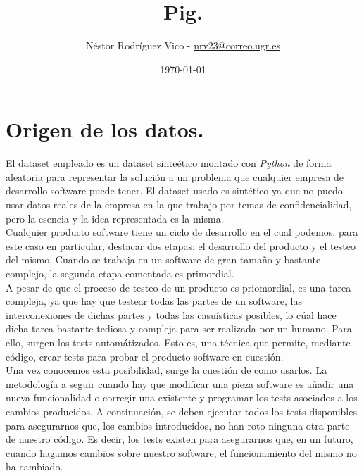 \documentclass[10pt]{article}
\title{Pig.}
\author{Néstor Rodríguez Vico - \href{mailto:nrv23@correo.ugr.es}{nrv23@correo.ugr.es}}
\date{\today}
\begin{document}
\maketitle

\setlength{\belowdisplayskip}{5pt} 
\setlength{\belowdisplayshortskip}{5pt}
\setlength{\abovedisplayskip}{5pt} 
\setlength{\abovedisplayshortskip}{5pt}

\section{Origen de los datos.}

El dataset empleado es un dataset sinteético montado con \textit{Python} de forma aleatoria para representar la solución a un problema que cualquier empresa de desarrollo software puede tener. El dataset usado es sintético ya que no puedo usar datos reales de la empresa en la que trabajo por temas de confidencialidad, pero la esencia y la idea representada es la misma. \\

Cualquier producto software tiene un ciclo de desarrollo en el cual podemos, para este caso en particular, destacar dos etapas: el desarrollo del producto y el testeo del mismo. Cuando se trabaja en un software de gran tamaño y bastante complejo, la segunda etapa comentada es primordial. \\

A pesar de que el proceso de testeo de un producto es priomordial, es una tarea compleja, ya que hay que testear todas las partes de un software, las interconexiones de dichas partes y todas las casuísticas posibles, lo cúal hace dicha tarea bastante tediosa y compleja para ser realizada por un humano. Para ello, surgen los tests automátizados. Esto es, una técnica que permite, mediante código, crear tests para probar el producto software en cuestión. \\

Una vez conocemos esta posibilidad, surge la cuestión de como usarlos. La metodología a seguir cuando hay que modificar una pieza software es añadir una nueva funcionalidad o corregir una existente y programar los tests asociados a los cambios producidos. A continuación, se deben ejecutar todos los tests disponibles para asegurarnos que, los cambios introducidos, no han roto ninguna otra parte de nuestro código. Es decir, los tests existen para asegurarnos que, en un futuro, cuando hagamos cambios sobre nuestro software, el funcionamiento del mismo no ha cambiado. \\
\end{document}
